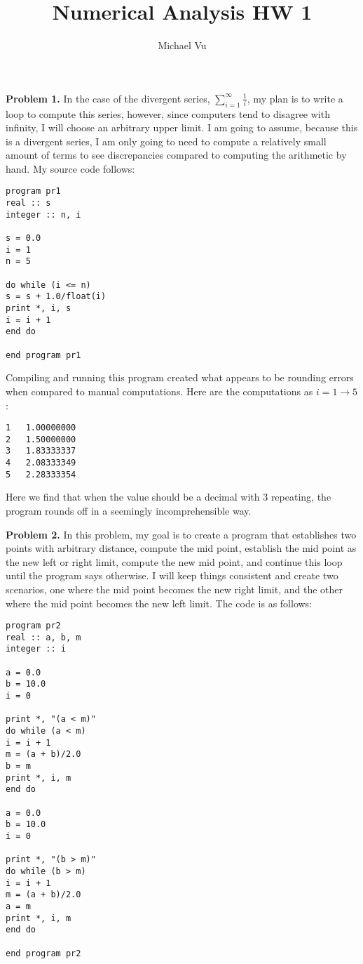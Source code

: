 \documentclass[12pt]{article}
\author{Michael Vu}
\title{Numerical Analysis HW 1}
\begin{document}


\maketitle %

\textbf{Problem 1.} In the case of the divergent series, $\sum\limits_{i=1}^\infty\frac{1}{i}$, my plan is to write a loop to compute this series, however, since computers tend to disagree with infinity, I will choose an arbitrary upper limit. I am going to assume, because this is a divergent series, I am only going to need to compute a relatively small amount of terms to see discrepancies compared to computing the arithmetic by hand. My source code follows:

\begin{verbatim}
program pr1
real :: s
integer :: n, i 

s = 0.0
i = 1
n = 5

do while (i <= n)
s = s + 1.0/float(i)
print *, i, s
i = i + 1
end do

end program pr1
\end{verbatim}

Compiling and running this program created what appears to be rounding errors when compared to manual computations. Here are the computations as $i=1\rightarrow 5$:

\begin{verbatim}
1   1.00000000
2   1.50000000
3   1.83333337
4   2.08333349
5   2.28333354
\end{verbatim}

Here we find that when the value should be a decimal with $3$ repeating, the program rounds off in a seemingly incomprehensible way. 

\bigskip
\textbf{Problem 2.} In this problem, my goal is to create a program that establishes two points with arbitrary distance, compute the mid point, establish the mid point as the new left or right limit, compute the new mid point, and continue this loop until the program says otherwise. I will keep things consistent and create two scenarios, one where the mid point becomes the new right limit, and the other where the mid point becomes the new left limit. The code is as follows:

\begin{verbatim}
program pr2
real :: a, b, m
integer :: i 

a = 0.0
b = 10.0
i = 0

print *, "(a < m)"
do while (a < m)
i = i + 1
m = (a + b)/2.0
b = m
print *, i, m
end do

a = 0.0
b = 10.0
i = 0

print *, "(b > m)"
do while (b > m)
i = i + 1
m = (a + b)/2.0
a = m
print *, i, m
end do

end program pr2
\end{verbatim}
\end{document}

